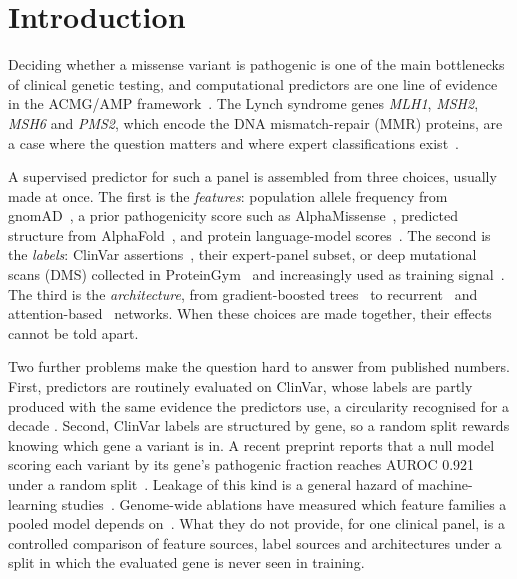 \documentclass[11pt]{article}
\newcommand{\gene}[1]{\textit{#1}}
\begin{document}
\section{Introduction}

Deciding whether a missense variant is pathogenic is one of the main bottlenecks of
clinical genetic testing, and computational predictors are one line of evidence in the
ACMG/AMP framework~\citep{richards2015acmg}. The Lynch syndrome genes \gene{MLH1},
\gene{MSH2}, \gene{MSH6} and \gene{PMS2}, which encode the DNA mismatch-repair (MMR)
proteins, are a case where the question matters and where expert classifications
exist~\citep{thompson2014insight}.

A supervised predictor for such a panel is assembled from three choices, usually made at
once. The first is the \emph{features}: population allele frequency from
gnomAD~\citep{karczewski2020gnomad,chen2024gnomad}, a prior pathogenicity score such as
AlphaMissense~\citep{cheng2023alphamissense}, predicted structure from
AlphaFold~\citep{jumper2021alphafold,varadi2022afdb}, and protein language-model
scores~\citep{meier2021pllr,rives2021esm,lin2023esm2,brandes2023espm}. The second is the
\emph{labels}: ClinVar assertions~\citep{landrum2018clinvar}, their expert-panel subset, or
deep mutational scans (DMS) collected in ProteinGym~\citep{notin2023proteingym} and
increasingly used as training signal~\citep{lafita2024dmsft,jagota2023transfer}. The third
is the \emph{architecture}, from gradient-boosted trees~\citep{chen2016xgboost} to
recurrent~\citep{hochreiter1997lstm} and attention-based~\citep{vaswani2017attention}
networks. When these choices are made together, their effects cannot be told apart.

Two further problems make the question hard to answer from published numbers. First,
predictors are routinely evaluated on ClinVar, whose labels are partly produced with the
same evidence the predictors use, a circularity recognised for a decade
\citep{grimm2015circularity}. Second, ClinVar labels are structured by gene, so a random
split rewards knowing which gene a variant is in. A recent preprint reports that a null
model scoring each variant by its gene's pathogenic fraction reaches AUROC 0.921 under a
random split~\citep{harrizi2026geneidentity}. Leakage of this kind is a general hazard of
machine-learning studies~\citep{kapoor2023leakage}. Genome-wide ablations have measured
which feature families a pooled model depends
on~\citep{muneeb2026annotatemissense}. What they do not provide, for one clinical panel,
is a controlled comparison of feature sources, label sources and architectures under a
split in which the evaluated gene is never seen in training.
\end{document}
